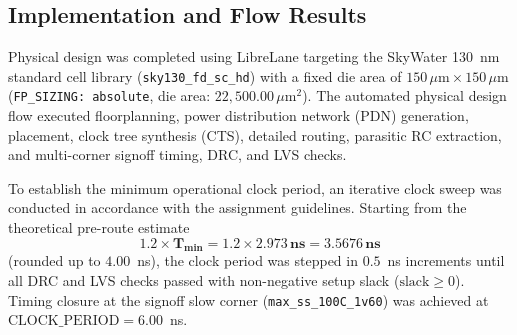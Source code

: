 \documentclass[12pt]{article}
\begin{document}
\subsection{Implementation and Flow Results}
Physical design was completed using LibreLane targeting the SkyWater 130~nm standard cell library (\texttt{sky130\_fd\_sc\_hd}) with a fixed die area of $150\,\mu\text{m} \times 150\,\mu\text{m}$ (\texttt{FP\_SIZING: absolute}, die area: $22,500.00\,\mu\text{m}^2$). The automated physical design flow executed floorplanning, power distribution network (PDN) generation, placement, clock tree synthesis (CTS), detailed routing, parasitic RC extraction, and multi-corner signoff timing, DRC, and LVS checks.

To establish the minimum operational clock period, an iterative clock sweep was conducted in accordance with the assignment guidelines. Starting from the theoretical pre-route estimate \[
\boldsymbol{1.2 \times T_{\min} = 1.2 \times 2.973\,\text{ns} = 3.5676\,\text{ns}}
\]
 (rounded up to $4.00$~ns), the clock period was stepped in $0.5$~ns increments until all DRC and LVS checks passed with non-negative setup slack ($\text{slack} \ge 0$). Timing closure at the signoff slow corner (\texttt{max\_ss\_100C\_1v60}) was achieved at $\text{CLOCK\_PERIOD} = 6.00$~ns.
\end{document}
